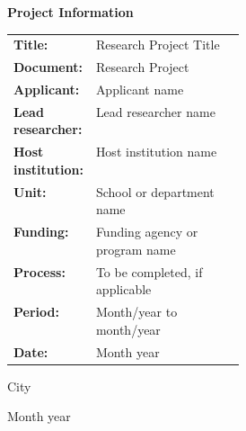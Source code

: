 \documentclass[a4paper,12pt]{article}
\newcommand{\projectTitle}{Research Project Title}
\newcommand{\docsubtitle}{Research Project}
\newcommand{\applicantName}{Applicant name}
\newcommand{\leadResearcher}{%
  Lead researcher name}
\newcommand{\hostInstitution}{Host institution name}
\newcommand{\hostDepartment}{School or department name}
\newcommand{\fundingAgency}{%
  Funding agency or program name}
\newcommand{\grantNumber}{%
  To be completed, if applicable}
\newcommand{\projectPeriod}{Month/year to month/year}
\newcommand{\docdate}{Month year}
\newcommand{\projectCity}{City}
\begin{document}



% 


\begin{titlepage}
  \thispagestyle{empty}
  \singlespacing
  \vspace*{1.5cm}
  \begin{center}
    {\color{feecNavy}\Large\bfseries
      Project Information\par}
    \vspace{1.4cm}
    \renewcommand{\arraystretch}{1.5}
    \begin{tabularx}{0.95\linewidth}{@{}
      >{\raggedright\arraybackslash\bfseries}
      p{0.30\linewidth}X@{}}
      Title: & \projectTitle \\
      Document: & \docsubtitle \\
      Applicant: & \applicantName \\
      Lead researcher: & \leadResearcher \\
      Host institution: & \hostInstitution \\
      Unit: & \hostDepartment \\
      Funding: & \fundingAgency \\
      Process: & \grantNumber \\
      Period: & \projectPeriod \\
      Date: & \docdate \\
    \end{tabularx}
  \end{center}
  \vfill
  \begin{center}
    \projectCity\par
    \docdate
  \end{center}
\end{titlepage}

\pagestyle{fancy}
\end{document}
